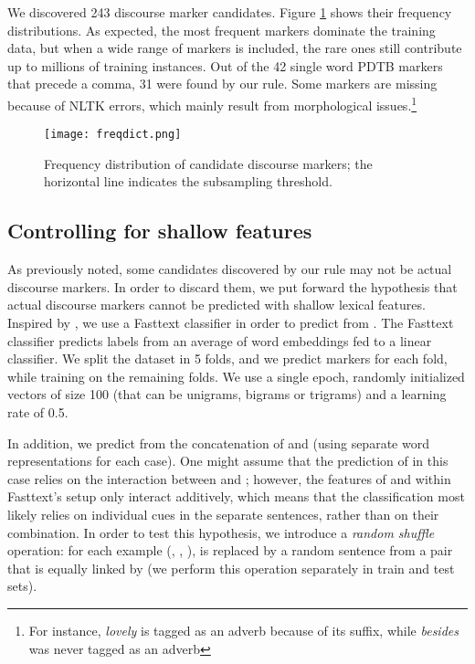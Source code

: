 \documentclass[11pt,a4paper]{article}
\begin{document}
We discovered 243 discourse marker candidates. Figure \ref{fig:freq} shows their frequency distributions. As expected, the most frequent markers dominate the training data, but when a wide range of markers is included, the rare ones still contribute up to millions of training instances. 
Out of the 42 single word PDTB markers that precede a comma, 31 were found by our rule. Some markers are missing because of NLTK errors, which mainly result from morphological issues.\footnote{For instance, {\it lovely} is tagged as an adverb because of its suffix, while {\it besides} was never tagged as an adverb}


\begin{figure}[]
  \centering
\texttt{[image: freqdict.png]}
  \caption{Frequency distribution of candidate discourse markers; 
  the horizontal line indicates the subsampling threshold.}
\label{fig:freq} 
\end{figure}


\subsection{Controlling for shallow features}
As previously noted, some candidates discovered by our rule may not be actual discourse markers. In order to discard them, we put forward the hypothesis that actual discourse markers cannot be predicted with shallow lexical features.
Inspired by \citet{Gururangan2018}, we use a Fasttext classifier \citep{joulin2016tricks} in order to predict  from . The Fasttext classifier predicts labels from an average of word embeddings fed to a linear classifier. We split the dataset in 5 folds, and we predict markers for each fold, while training on the remaining folds. We use a single epoch, randomly initialized vectors of size 100 (that can be unigrams, bigrams or trigrams) and a learning rate of 0.5.


In addition, we predict  from the concatenation of  and  (using separate word representations for each case). One might assume that the prediction of  in this case relies on the interaction between  and ; however, the features of  and  within Fasttext's setup only interact additively, which means that the classification most likely relies on individual cues in the separate sentences, rather than on their combination.  In order to test this hypothesis, we introduce a \textit{random shuffle} operation: for each example (, , ),  is replaced by a random sentence from a pair that is equally linked by  (we perform this operation separately in train and test sets).
\end{document}
